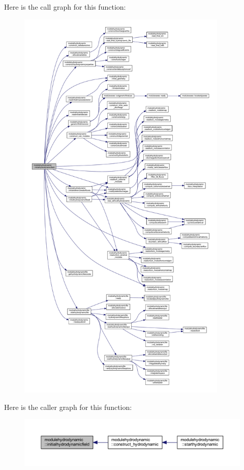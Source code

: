 Here is the call graph for this function\+:\nopagebreak
\begin{figure}[H]
\begin{center}
\leavevmode
\includegraphics[height=550pt]{namespacemodulehydrodynamic_a4627a0c2583b12e5490b0ddf81573972_cgraph}
\end{center}
\end{figure}
Here is the caller graph for this function\+:\nopagebreak
\begin{figure}[H]
\begin{center}
\leavevmode
\includegraphics[width=350pt]{namespacemodulehydrodynamic_a4627a0c2583b12e5490b0ddf81573972_icgraph}
\end{center}
\end{figure}
\mbox{\label{namespacemodulehydrodynamic_acc95ab35ad823a54bc0cab6a88e60830}} 
